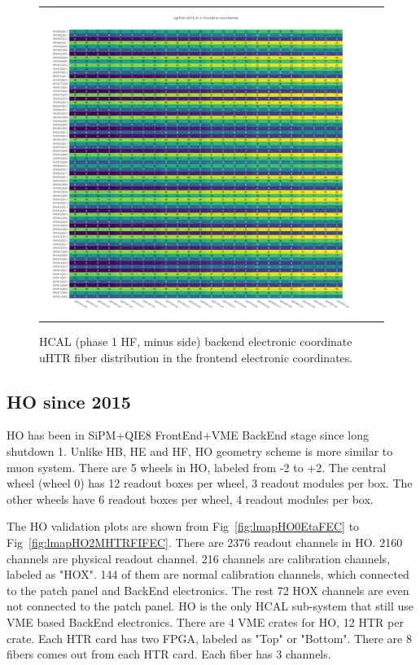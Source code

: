 \begin{figure}[htb]
 \begin{center}
  \begin{tabular}{cc}
   \includegraphics[angle=0,width=0.95\textwidth]{figures/appendix/ngHFM_uHTR_FI_in_FrontEnd.png}
  \end{tabular}
  \caption{HCAL (phase 1 HF, minus side) backend electronic coordinate uHTR fiber distribution in the frontend electronic coordinates.}
  \label{fig:lmapngHFMuHTRFIFEC}
 \end{center}
\end{figure}
\clearpage

\subsection{HO since 2015}
HO has been in SiPM+QIE8 FrontEnd+VME BackEnd stage since long shutdown 1. Unlike HB, HE and HF, HO geometry scheme is more similar to muon system. There are 5 wheels in HO, labeled from -2 to +2. The central wheel (wheel 0) has 12 readout boxes per wheel, 3 readout modules per box. The other wheels have 6 readout boxes per wheel, 4 readout modules per box.

The HO validation plots are shown from Fig~\ref{fig:lmapHO0EtaFEC} to Fig~\ref{fig:lmapHO2MHTRFIFEC}. There are 2376 readout channels in HO. 2160 channels are physical readout channel. 216 channels are calibration channels, labeled as "HOX". 144 of them are normal calibration channels, which connected to the patch panel and BackEnd electronics. The rest 72 HOX channels are even not connected to the patch panel. HO is the only HCAL sub-system that still use VME based BackEnd electronics. There are 4 VME crates for HO, 12 HTR per crate. Each HTR card has two FPGA, labeled as "Top" or "Bottom". There are 8 fibers comes out from each HTR card. Each fiber has 3 channels.
\clearpage

